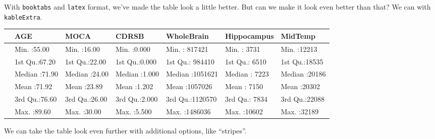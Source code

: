 \documentclass[]{article}
\newenvironment{Shaded}{\begin{snugshade}}{\end{snugshade}}
\newcommand{\DataTypeTok}[1]{\textcolor[rgb]{0.13,0.29,0.53}{#1}}
\newcommand{\DecValTok}[1]{\textcolor[rgb]{0.00,0.00,0.81}{#1}}
\newcommand{\KeywordTok}[1]{\textcolor[rgb]{0.13,0.29,0.53}{\textbf{#1}}}
\newcommand{\NormalTok}[1]{#1}
\newcommand{\OperatorTok}[1]{\textcolor[rgb]{0.81,0.36,0.00}{\textbf{#1}}}
\newcommand{\StringTok}[1]{\textcolor[rgb]{0.31,0.60,0.02}{#1}}
\begin{document}
With \texttt{booktabs} and \texttt{latex} format, we've made the table
look a little better. But can we make it look even better than that? We
can with \texttt{kableExtra}.

\begin{Shaded}
\end{Shaded}

\begin{table}[H]
\centering\begingroup\fontsize{10}{12}\selectfont

\begin{tabular}{lllllll}
\toprule
  &      AGE &      MOCA &     CDRSB &   WholeBrain &  Hippocampus &    MidTemp\\
\midrule
 & Min.   :55.00 & Min.   :16.00 & Min.   :0.000 & Min.   : 817421 & Min.   : 3731 & Min.   :12213\\
 & 1st Qu.:67.20 & 1st Qu.:22.00 & 1st Qu.:0.000 & 1st Qu.: 984410 & 1st Qu.: 6510 & 1st Qu.:18535\\
 & Median :71.90 & Median :24.00 & Median :1.000 & Median :1051621 & Median : 7223 & Median :20186\\
 & Mean   :71.92 & Mean   :23.89 & Mean   :1.202 & Mean   :1057026 & Mean   : 7150 & Mean   :20302\\
 & 3rd Qu.:76.60 & 3rd Qu.:26.00 & 3rd Qu.:2.000 & 3rd Qu.:1120570 & 3rd Qu.: 7834 & 3rd Qu.:22088\\
\addlinespace
 & Max.   :89.60 & Max.   :30.00 & Max.   :5.500 & Max.   :1486036 & Max.   :10602 & Max.   :32189\\
\bottomrule
\end{tabular}\endgroup{}
\end{table}

We can take the table look even further with additional options, like
``stripes''.

\begin{Shaded}
\end{Shaded}
\end{document}

